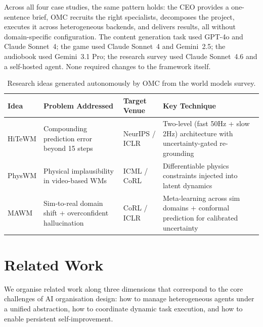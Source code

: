 \documentclass[11pt,a4paper]{article}
\begin{document}
Across all four case studies, the same pattern holds: the CEO provides a one-sentence brief, OMC recruits the right specialists, decomposes the project, executes it across heterogeneous backends, and delivers results, all without domain-specific configuration.  The content generation task used GPT-4o and Claude Sonnet~4; the game used Claude Sonnet~4 and Gemini~2.5; the audiobook used Gemini~3.1 Pro; the research survey used Claude Sonnet~4.6 and a self-hosted agent.  None required changes to the framework itself.

\begin{table}[t]
\centering
\caption{Research ideas generated autonomously by OMC from the world models survey.}
\label{tab:research-ideas}
\small
\setlength{\tabcolsep}{3pt}
\begin{tabularx}{\textwidth}{@{}>{\raggedright\arraybackslash}p{2.8cm}>{\raggedright\arraybackslash}p{3.5cm}>{\raggedright\arraybackslash}p{2.2cm}X@{}}
\toprule
\textbf{Idea} & \textbf{Problem Addressed} & \textbf{Target Venue} & \textbf{Key Technique} \\
\midrule
HiTeWM & Compounding prediction error beyond 15 steps & NeurIPS / ICLR & Two-level (fast 50Hz + slow 2Hz) architecture with uncertainty-gated re-grounding \\
\addlinespace
PhysWM & Physical implausibility in video-based WMs & ICML / CoRL & Differentiable physics constraints injected into latent dynamics \\
\addlinespace
MAWM & Sim-to-real domain shift + overconfident hallucination & CoRL / ICLR & Meta-learning across sim domains + conformal prediction for calibrated uncertainty \\
\bottomrule
\end{tabularx}
\end{table}



\section{Related Work}
\label{sec:related}

We organise related work along three dimensions that correspond to the core challenges of AI organisation design: how to manage heterogeneous agents under a unified abstraction, how to coordinate dynamic task execution, and how to enable persistent self-improvement.
\end{document}
